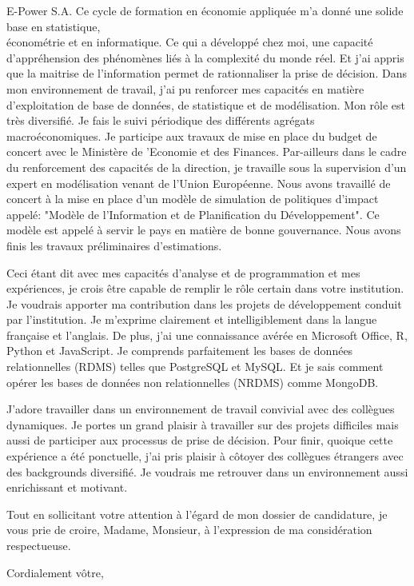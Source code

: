 \documentclass[11pt]{letter} %
\begin{document}
\begin{letter}{E-Power S.A.}
	Ce cycle de formation en économie appliquée m’a donné une solide base en statistique, \\
	économétrie et en informatique. Ce qui a développé chez moi, une capacité d’appréhension des phénomènes liés à la complexité du monde réel. Et j’ai appris que la maitrise de l’information permet de rationnaliser la prise de décision. Dans mon environnement de travail, j’ai pu renforcer mes capacités en matière d’exploitation de base de données, de statistique et de modélisation. Mon rôle est très diversifié. Je fais le suivi périodique des différents agrégats macroéconomiques. Je participe aux travaux de mise en place du budget de concert avec le Ministère de ’Economie et des Finances. Par-ailleurs dans le cadre du renforcement des capacités de la direction, je travaille sous la supervision d’un expert en modélisation venant de l’Union Européenne. Nous avons travaillé de concert à la mise en place d’un modèle de simulation de politiques d’impact appelé: "Modèle de l’Information et de Planification du Développement". Ce modèle est appelé à servir le pays en matière de bonne gouvernance. Nous avons finis les travaux préliminaires d’estimations.
	
	Ceci étant dit avec mes capacités d’analyse et de programmation et mes expériences, je crois être capable de remplir le rôle certain dans votre institution. Je voudrais apporter ma contribution dans les projets de développement conduit par l’institution. Je m’exprime clairement et intelligiblement dans la langue française et l’anglais. De plus, j’ai une connaissance avérée en Microsoft Office, R, Python et JavaScript. Je comprends parfaitement les bases de données relationnelles (RDMS) telles que PostgreSQL et MySQL. Et je sais comment opérer les bases de données non relationnelles (NRDMS) comme MongoDB.
	
	J’adore travailler dans un environnement de travail convivial avec des collègues dynamiques. Je portes un grand plaisir à travailler sur des projets difficiles mais aussi de participer aux processus de prise de décision. Pour finir, quoique cette expérience a été ponctuelle, j’ai pris plaisir à côtoyer des collègues étrangers avec des backgrounds diversifié. Je voudrais me retrouver dans un environnement aussi enrichissant et motivant.
	
	
	Tout en sollicitant votre attention à l’égard de mon dossier de candidature, je vous prie de croire, Madame, Monsieur, à l’expression de ma considération respectueuse.

 


\closing{Cordialement v\^{o}tre,}




\end{letter}
\end{document}
